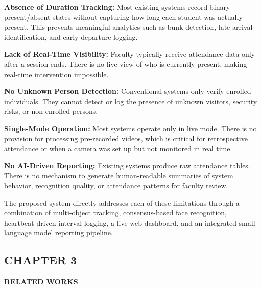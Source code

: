 \documentclass{report}
\begin{document}
\textbf{Absence of Duration Tracking:} Most existing systems record binary present/absent states without\vspace{3pt} capturing how long each student was actually present. This prevents meaningful analytics such as\vspace{3pt} bunk detection, late arrival identification, and early departure logging.

\textbf{Lack of Real-Time Visibility:} Faculty typically receive attendance data only after a session\vspace{3pt} ends. There is no live view of who is currently present, making real-time intervention impossible.

\textbf{No Unknown Person Detection:} Conventional systems only verify enrolled individuals. They\vspace{3pt} cannot detect or log the presence of unknown visitors, security risks, or non-enrolled persons.

\textbf{Single-Mode Operation:} Most systems operate only in live mode. There is no provision for\vspace{3pt} processing pre-recorded videos, which is critical for retrospective attendance or when a camera\vspace{3pt} was set up but not monitored in real time.

\textbf{No AI-Driven Reporting:} Existing systems produce raw attendance tables. There is no mechanism\vspace{3pt} to generate human-readable summaries of system behavior, recognition quality, or attendance\vspace{3pt} patterns for faculty review.

The proposed system directly addresses each of these limitations through a combination of multi-object\vspace{3pt} tracking, consensus-based face recognition, heartbeat-driven interval logging, a live web dashboard,\vspace{3pt} and an integrated small language model reporting pipeline.

\newpage
\begin{center}
    \section*{\textbf{CHAPTER 3}}
\end{center}
\begin{center}
    \textbf{\Large RELATED WORKS}\\[20pt]
\end{center}
\end{document}
